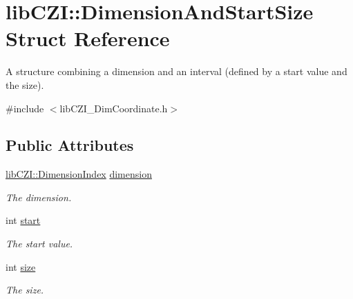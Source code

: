 \hypertarget{structlib_c_z_i_1_1_dimension_and_start_size}{}\section{lib\+C\+ZI\+:\+:Dimension\+And\+Start\+Size Struct Reference}
\label{structlib_c_z_i_1_1_dimension_and_start_size}


A structure combining a dimension and an interval (defined by a start value and the size).  




{\ttfamily \#include $<$lib\+C\+Z\+I\+\_\+\+Dim\+Coordinate.\+h$>$}

\subsection*{Public Attributes}
\begin{DoxyCompactItemize}
\item 
\mbox{\label{structlib_c_z_i_1_1_dimension_and_start_size_a2f34bc92aad06f8c6d4d54e847e5a9f9}} 
\hyperlink{namespacelib_c_z_i_a55049658acf59d0eddfaebcad16df424}{lib\+C\+Z\+I\+::\+Dimension\+Index} \hyperlink{structlib_c_z_i_1_1_dimension_and_start_size_a2f34bc92aad06f8c6d4d54e847e5a9f9}{dimension}
\begin{DoxyCompactList}\small\item\em The dimension. \end{DoxyCompactList}\item 
\mbox{\label{structlib_c_z_i_1_1_dimension_and_start_size_abea9803a01b3f198f34ed14278669500}} 
int \hyperlink{structlib_c_z_i_1_1_dimension_and_start_size_abea9803a01b3f198f34ed14278669500}{start}
\begin{DoxyCompactList}\small\item\em The start value. \end{DoxyCompactList}\item 
\mbox{\label{structlib_c_z_i_1_1_dimension_and_start_size_ac0953e9273d2261ee3d282dac2683175}} 
int \hyperlink{structlib_c_z_i_1_1_dimension_and_start_size_ac0953e9273d2261ee3d282dac2683175}{size}
\begin{DoxyCompactList}\small\item\em The size. \end{DoxyCompactList}\end{DoxyCompactItemize}


